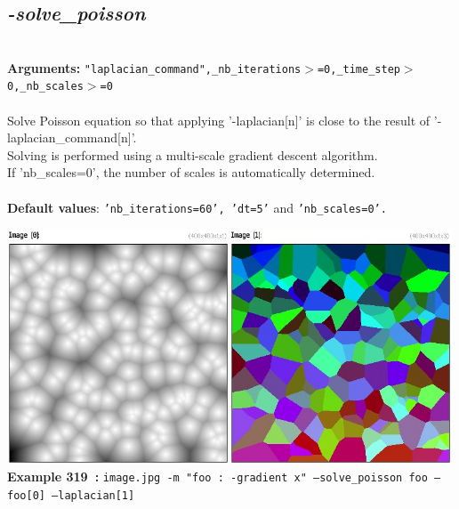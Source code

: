 \documentclass[a4paper,11pt,twoside]{book}
\begin{document}
\subsection{\emph{-solve\_poisson} }\vspace*{-0.5em}
~\\\textbf{Arguments: } 
{\small \texttt{"laplacian\_command",\_nb\_iterations$>$=0,\_time\_step$>$0,\_nb\_scales$>$=0}}\\~\\
Solve Poisson equation so that applying '-laplacian[n]' is close to the result of '-laplacian\_command[n]'.
~\\Solving is performed using a multi-scale gradient descent algorithm.
~\\If 'nb\_scales=0', the number of scales is automatically determined.
~\\~\\\textbf{Default values}: {\small \texttt{'nb\_iterations=60', 'dt=5'} and \texttt{'nb\_scales=0'.}}
\begin{center}\includegraphics[keepaspectratio=true,height=7cm,width=\textwidth]{img/gmic_def319.jpg}\\
{\footnotesize \textbf{Example 319~:} \texttt{image.jpg -m "foo : -gradient x" --solve\_poisson foo --foo[0] --laplacian[1]}}
\end{center}
\end{document}
